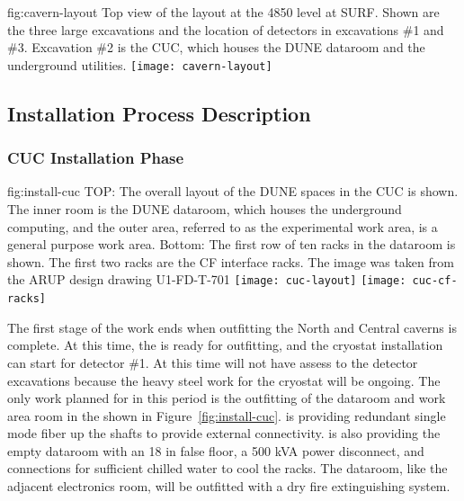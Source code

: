 \begin{dunefigure}{fig:cavern-layout}
  {Top view of the layout at the 4850 level at SURF. Shown are the three large excavations and the location of detectors in excavations \#1 and \#3. Excavation \#2 is the CUC, which houses the DUNE dataroom and the underground utilities.}
\texttt{[image: cavern-layout]}
\end{dunefigure}



\subsection{Installation Process Description}
\label{sec:fdsp-tc-inst-proc}


\subsubsection{CUC Installation Phase}

\begin{dunefigure}{fig:install-cuc}
  {TOP: The overall layout of the DUNE spaces in the CUC is shown. The inner room is the DUNE dataroom, which houses the underground computing, and the outer area, referred to as the experimental work area, is a general purpose work area. Bottom: The first row of ten racks in the dataroom is shown. The first two racks are the  CF interface racks. The image was taken from the ARUP design drawing U1-FD-T-701}
\texttt{[image: cuc-layout]}
\texttt{[image: cuc-cf-racks]}
\end{dunefigure}


The first stage of the  work ends when outfitting the North and Central caverns is complete. At this time, the  is ready for  outfitting, and the cryostat installation can start for detector \#1. At this time  will not have assess to the detector excavations because the heavy steel work for the cryostat will be ongoing. The only work planned for  in this period is the outfitting of the dataroom and work area room in the  shown in Figure~\ref{fig:install-cuc}.   is providing redundant single mode fiber up the shafts to provide external connectivity.   is also providing the empty dataroom with an 18 \si{in} false floor, a 500 \si{kVA} power disconnect, and connections for sufficient chilled water to cool the racks. The dataroom, like the adjacent  electronics room, will be outfitted with a dry fire extinguishing system. 

